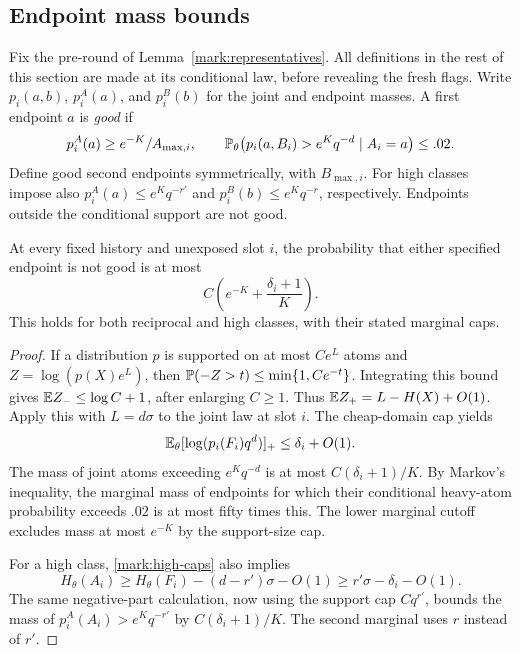 \subsection{Endpoint mass bounds}

Fix the pre-round of Lemma~\ref{mark:representatives}. All definitions
in the rest of this section are made at its conditional law, before
revealing the fresh flags. Write
$p_i(a,b)$, $p_i^A(a)$, and $p_i^B(b)$ for the joint and endpoint
masses. A first endpoint $a$ is \emph{good} if
\[
 p_i^A(a)\ge e^{-K}/A_{\max,i},\qquad
 \mathbb P_\theta\bigl(p_i(a,B_i)>e^Kq^{-d}\mid A_i=a\bigr)\le .02.
\]
Define good second endpoints symmetrically, with $B_{\max,i}$.
For high classes impose also
$p_i^A(a)\le e^Kq^{-r'}$ and $p_i^B(b)\le e^Kq^{-r}$,
respectively. Endpoints outside the conditional support are not good.

\begin{lemma}\label{mark:endpoint-mass}
At every fixed history and unexposed slot $i$, the probability that
either specified endpoint is not good is at most
\begin{equation}\label{mark:bad-endpoints}
 C\left(e^{-K}+\frac{\delta_i+1}{K}\right).
\end{equation}
This holds for both reciprocal and high classes, with their stated
marginal caps.
\end{lemma}

\begin{proof}
If a distribution $p$ is supported on at most $Ce^L$ atoms and
$Z=\log(p(X)e^L)$, then
$\mathbb P(-Z>t)\le\min\{1,Ce^{-t}\}$. Integrating this bound gives
$\mathbb E Z_-\le\log C+1$, after enlarging $C\ge1$. Thus
$\mathbb E Z_+=L-H(X)+O(1)$. Apply this with $L=d\sigma$ to the joint
law at slot $i$. The cheap-domain cap yields
\[
 \mathbb E_\theta[\log(p_i(F_i)q^d)]_+\le\delta_i+O(1).
\]
The mass of joint atoms exceeding $e^Kq^{-d}$ is at most
$C(\delta_i+1)/K$. By Markov's inequality, the marginal mass of
endpoints for which their conditional heavy-atom probability exceeds
$.02$ is at most fifty times this. The lower marginal cutoff excludes
mass at most $e^{-K}$ by the support-size cap.

For a high class, \eqref{mark:high-caps} also implies
\[
 H_\theta(A_i)\ge H_\theta(F_i)-(d-r')\sigma-O(1)
                  \ge r'\sigma-\delta_i-O(1).
\]
The same negative-part calculation, now using the support cap $Cq^{r'}$,
bounds the mass of $p_i^A(A_i)>e^Kq^{-r'}$ by
$C(\delta_i+1)/K$. The second marginal uses $r$ instead of $r'$.
\end{proof}

